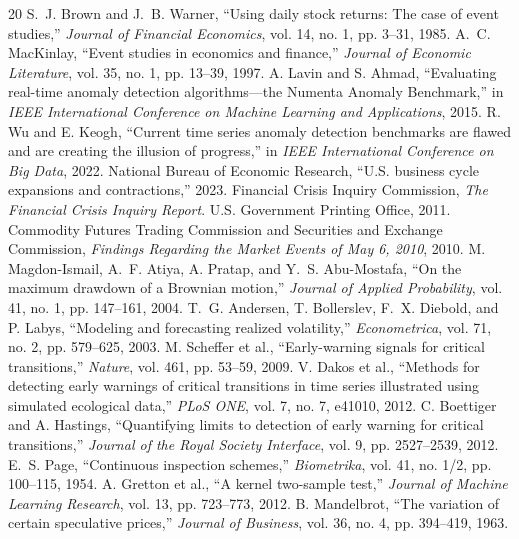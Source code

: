 \documentclass[pdflatex,sn-mathphys-num]{sn-jnl}
\begin{document}
\begin{thebibliography}{20}
 S.~J. Brown and J.~B. Warner, ``Using daily stock returns: The case of event studies,'' \emph{Journal of Financial Economics}, vol. 14, no. 1, pp. 3--31, 1985.
 A.~C. MacKinlay, ``Event studies in economics and finance,'' \emph{Journal of Economic Literature}, vol. 35, no. 1, pp. 13--39, 1997.
 A. Lavin and S. Ahmad, ``Evaluating real-time anomaly detection algorithms---the Numenta Anomaly Benchmark,'' in \emph{IEEE International Conference on Machine Learning and Applications}, 2015.
 R. Wu and E. Keogh, ``Current time series anomaly detection benchmarks are flawed and are creating the illusion of progress,'' in \emph{IEEE International Conference on Big Data}, 2022.
 National Bureau of Economic Research, ``U.S. business cycle expansions and contractions,'' 2023.
 Financial Crisis Inquiry Commission, \emph{The Financial Crisis Inquiry Report}. U.S. Government Printing Office, 2011.
 Commodity Futures Trading Commission and Securities and Exchange Commission, \emph{Findings Regarding the Market Events of May 6, 2010}, 2010.
 M. Magdon-Ismail, A.~F. Atiya, A. Pratap, and Y.~S. Abu-Mostafa, ``On the maximum drawdown of a Brownian motion,'' \emph{Journal of Applied Probability}, vol. 41, no. 1, pp. 147--161, 2004.
 T.~G. Andersen, T. Bollerslev, F.~X. Diebold, and P. Labys, ``Modeling and forecasting realized volatility,'' \emph{Econometrica}, vol. 71, no. 2, pp. 579--625, 2003.
 M. Scheffer et al., ``Early-warning signals for critical transitions,'' \emph{Nature}, vol. 461, pp. 53--59, 2009.
 V. Dakos et al., ``Methods for detecting early warnings of critical transitions in time series illustrated using simulated ecological data,'' \emph{PLoS ONE}, vol. 7, no. 7, e41010, 2012.
 C. Boettiger and A. Hastings, ``Quantifying limits to detection of early warning for critical transitions,'' \emph{Journal of the Royal Society Interface}, vol. 9, pp. 2527--2539, 2012.
 E.~S. Page, ``Continuous inspection schemes,'' \emph{Biometrika}, vol. 41, no. 1/2, pp. 100--115, 1954.
 A. Gretton et al., ``A kernel two-sample test,'' \emph{Journal of Machine Learning Research}, vol. 13, pp. 723--773, 2012.
 B. Mandelbrot, ``The variation of certain speculative prices,'' \emph{Journal of Business}, vol. 36, no. 4, pp. 394--419, 1963.

\end{thebibliography}
\end{document}
